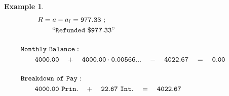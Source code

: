 \documentclass[12pt,letterpaper,oneside]{article}
\newtheorem{example}{Example}[section]
\theoremstyle{remark} %
\begin{document}
\begin{example}
\begin{align*}
	R&=a-a_{\rm{f}}=\mathtt{977.33}\ ;\\
	&\quad\;\mathtt{``Refunded\ \$977.33"}\\[12pt] %
	&\!\!\!\!\!\!\!\!\!\!\!\!\!\!\!\!\!\!\!\mathtt{Monthly\ Balance:}\\
	&\!\!\!\!\!\!\!\mathtt{4000.00}\quad +\quad\mathtt{4000.00}\cdot \mathtt{\rate}\quad -\quad \mathtt{4022.67}\quad =\quad \mathtt{0.00}\\[12pt]
	&\!\!\!\!\!\!\!\!\!\!\!\!\!\!\!\!\!\!\!\mathtt{Breakdown\ of\ Pay:}\\
	&\!\!\!\!\!\!\!\mathtt{4000.00\ Prin.}\quad +\quad\mathtt{22.67\ Int.}\quad =\quad\mathtt{4022.67}
	\end{align*}
	\end{example}

	\normalsize
	\newpage
\end{document}
